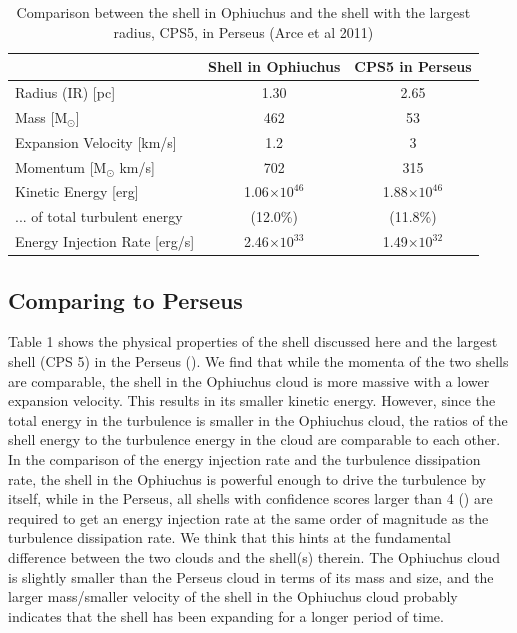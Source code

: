\documentclass[11pt,a4paper]{emulateapj}
\begin{document}
\begin{table}
\centering
\begin{tabular}{lcc}
\hline
& \textbf{Shell in Ophiuchus} & \textbf{CPS5 in Perseus} \\   
\hline
Radius (IR) [pc] & 1.30 & 2.65 \\ 
Mass [M$_{\odot}$] & 462 & 53 \\ 
Expansion Velocity [km/s] & 1.2 & 3 \\ 
Momentum [M$_{\odot}$ km/s]& 702 & 315 \\ 
Kinetic Energy [erg]& 1.06$\times10^{46}$ & 1.88$\times10^{46}$ \\ 
... of total turbulent energy & (12.0\%) & (11.8\%) \\ 
Energy Injection Rate [erg/s] & 2.46$\times10^{33}$ & 1.49$\times10^{32}$ \\
\hline
\end{tabular}
\caption{Comparison between the shell in Ophiuchus and the shell with the largest radius, CPS5, in Perseus (Arce et al 2011)}
\end{table}

\subsection{Comparing to Perseus}
Table 1 shows the physical properties of the shell discussed here and the largest shell (CPS 5) in the Perseus (\citet{Arce_2011}). We find that while the momenta of the two shells are comparable, the shell in the Ophiuchus cloud is more massive with a lower expansion velocity. This results in its smaller kinetic energy. However, since the total energy in the turbulence is smaller in the Ophiuchus cloud, the ratios of the shell energy to the turbulence energy in the cloud are comparable to each other. In the comparison of the energy injection rate and the turbulence dissipation rate, the shell in the Ophiuchus is powerful enough to drive the turbulence by itself, while in the Perseus, all shells with confidence scores larger than 4 (\citet{Arce_2011}) are required to get an energy injection rate at the same order of magnitude as the turbulence dissipation rate. We think that this hints at the fundamental difference between the two clouds and the shell(s) therein. The Ophiuchus cloud is slightly smaller than the Perseus cloud in terms of its mass and size, and the larger mass/smaller velocity of the shell in the Ophiuchus cloud probably indicates that the shell has been expanding for a longer period of time.
\end{document}
